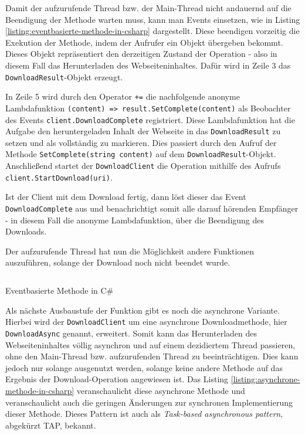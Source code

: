 Damit der aufzurufende Thread bzw. der Main-Thread nicht andauernd auf die Beendigung der Methode warten muss, kann man Events einsetzen, wie in Listing \ref{listing:eventbasierte-methode-in-csharp} dargestellt. Diese beendigen vorzeitig die Exekution der Methode, indem der Aufrufer ein Objekt übergeben bekommt. Dieses Objekt repräsentiert den derzeitigen Zustand der Operation - also in diesem Fall das Herunterladen des Webseiteninhaltes. Dafür wird in Zeile 3 das \texttt{DownloadResult}-Objekt erzeugt.

In Zeile 5 wird durch den Operator \texttt{+=} die nachfolgende anonyme Lambdafunktion \texttt{(content) => result.SetComplete(content)} als Beobachter des Events \texttt{client.DownloadComplete} registriert. Diese Lambdafunktion hat die Aufgabe den heruntergeladen Inhalt der Webseite in das \texttt{DownloadResult} zu setzen und als vollständig zu markieren. Dies passiert durch den Aufruf der Methode \texttt{SetComplete(string content)} auf dem \texttt{DownloadResult}-Objekt. Anschließend startet der \texttt{DownloadClient} die Operation mithilfe des Aufrufs \texttt{client.StartDownload(uri)}.

Ist der Client mit dem Download fertig, dann löst dieser das Event \texttt{DownloadComplete} aus und benachrichtigt somit alle darauf hörenden Empfänger - in diesem Fall die anonyme Lambdafunktion, über die Beendigung des Downloads.

Der aufzurufende Thread hat nun die Möglichkeit andere Funktionen auszuführen, solange der Download noch nicht beendet wurde.

\begin{listing}[H]
    \inputminted[framesep=2mm, baselinestretch=1.2, fontsize=\normalsize, linenos]{csharp}{codes/example_eventbased.cs}
    \caption{Eventbasierte Methode in C\#}
    \label{listing:eventbasierte-methode-in-csharp}
\end{listing}

Als nächste Ausbaustufe der Funktion gibt es noch die asynchrone Variante. Hierbei wird der \texttt{DownloadClient} um eine asynchrone Downloadmethode, hier \texttt{DownloadAsync} genannt, erweitert. Somit kann das Herunterladen des Webseiteninhaltes völlig asynchron und auf einem dezidiertem Thread passieren, ohne den Main-Thread bzw. aufzurufenden Thread zu beeinträchtigen. Dies kann jedoch nur solange ausgenutzt werden, solange keine andere Methode auf das Ergebnis der Download-Operation angewiesen ist. Das Listing \ref{listing:asynchrone-methode-in-csharp} veranschaulicht diese asynchrone Methode und veranschaulicht auch die geringen Änderungen zur synchronen Implementierung dieser Methode. Dieses Pattern ist auch als \textit{Task-based asynchronous pattern}, abgekürzt TAP, bekannt.

